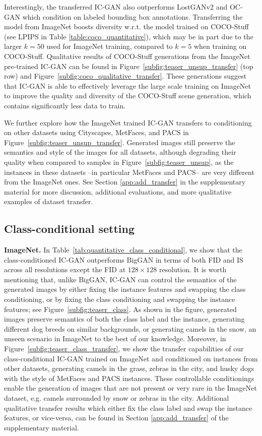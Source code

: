 Interestingly, the transferred {IC-GAN} also outperforms LostGANv2 and OC-GAN  which condition on  labeled bounding box annotations. Transferring the model from ImageNet  boosts diversity {w.r.t.} the model trained on COCO-Stuff (see LPIPS in Table \ref{table:coco_quantitative}), which may be in part due to the   larger $k\!=\!50$ used for ImageNet training, compared to $k\!=\!5$ when training on COCO-Stuff.  Qualitative results of COCO-Stuff generations from the ImageNet pre-trained {IC-GAN} can be found in Figure~\ref{subfig:teaser_unsup_transfer} (top row) and Figure~\ref{subfig:coco_qualitative_transfer}.
These generations suggest that {IC-GAN} is able to effectively leverage the large scale training on ImageNet to improve the quality and diversity of the COCO-Stuff scene generation, which contains significantly less data to train. 

We further explore how  the ImageNet trained {IC-GAN} transfers to  conditioning on other datasets using Cityscapes, MetFaces, and PACS  in Figure~\ref{subfig:teaser_unsup_transfer}. 
Generated images still preserve the semantics and style of the images for all datasets, although degrading their quality when compared to samples in Figure~\ref{subfig:teaser_unsup}, as the instances in these datasets --in particular MetFaces and PACS-- are very different from the ImageNet ones. See Section \ref{app:add_transfer} in the supplementary material for more discussion,  additional evaluations, and more qualitative examples of dataset transfer.

\subsection{Class-conditional setting}
\label{sec:supervised}

\textbf{ImageNet.} In Table~\ref{tab:quantitative_class_conditional}, we show that the class-conditioned {IC-GAN} outperforms BigGAN in terms of both FID and IS across all resolutions except the FID at $128\!\times\!128$ resolution. It is worth mentioning that, unlike BigGAN, {IC-GAN} can control the semantics of the generated images by either fixing the instance features and swapping the class conditioning, or by fixing the class conditioning and swapping the instance features; see Figure~\ref{subfig:teaser_class}. As shown in the figure, generated images preserve  semantics of both the class label and the instance, generating different dog breeds on similar backgrounds, or generating camels in the snow, an unseen scenario in ImageNet to the best of our knowledge. Moreover, in Figure~\ref{subfig:teaser_class_transfer}, we show the transfer capabilities of our class-conditional {IC-GAN} trained on ImageNet and conditioned on instances from other datasets, generating camels in the grass, zebras in the city, and husky dogs with the style of MetFaces and PACS instances. These controllable conditionings enable the generation of images that are not present or very rare in the ImageNet dataset, e.g. camels surrounded by snow or zebras in the city. Additional qualitative transfer results which either fix the class label and swap the instance features, or vice-versa,  can be found in Section \ref{app:add_transfer} of the supplementary material.

